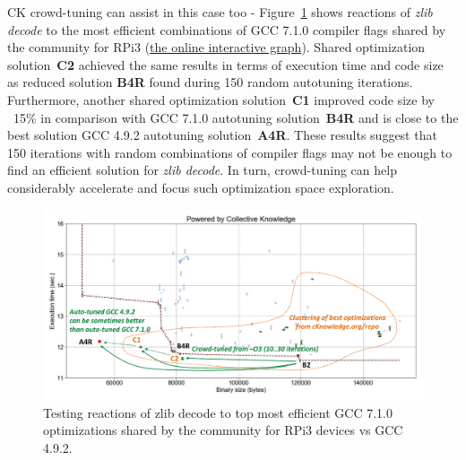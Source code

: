CK crowd-tuning can assist in this case too - Figure~\ref{fig:autotuning-zlib-decode-gcc7-reactions}
shows reactions of \textit{zlib decode} to the most efficient combinations of GCC 7.1.0 compiler flags
shared by the community for RPi3 
(\href{http://cknowledge.org/repo/web.php?wcid=graph:a53089441c68c978&subgraph=rpi3-autotuning-zlib-decode-gcc7-reactions-interactive}{the online interactive graph}).
%
Shared optimization solution~\textbf{C2} achieved the same results in terms of execution time and code size
as reduced solution \textbf{B4R} found during 150 random autotuning iterations.
%
Furthermore, another shared optimization solution~\textbf{C1} improved code size by ~15\% in comparison
with GCC 7.1.0 autotuning solution~\textbf{B4R} and is close to the best solution GCC 4.9.2 autotuning solution~\textbf{A4R}.
%
These results suggest that 150 iterations with random combinations of compiler flags 
may not be enough to find an efficient solution for \textit{zlib decode}.
%
In turn, crowd-tuning can help considerably accelerate and focus such optimization space exploration.

   \begin{figure}[!htbp]
     \centering
      \includegraphics[width=5.2in]
      {ck-assets/74ba8b07475626f5-cropped.pdf} %
      \vspace{0.1in}
      \vspace{0.1in}
     \caption{
      Testing reactions of zlib decode to top most efficient GCC 7.1.0 optimizations shared by the community for RPi3 devices vs GCC 4.9.2.
     }
     \label{fig:autotuning-zlib-decode-gcc7-reactions}
   \end{figure}

